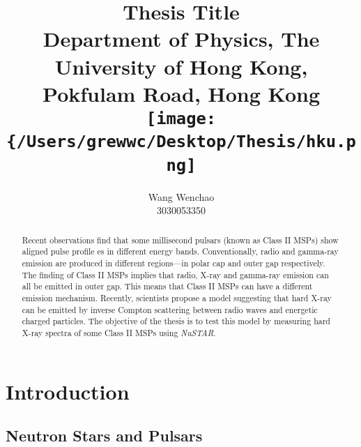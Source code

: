 \documentclass[12pt]{report}
\title{\textbf{Thesis Title}\\ \vspace{1cm}
			{\large Department of Physics, The University of Hong Kong, Pokfulam Road, Hong Kong}\\ \vspace{1cm}
			{\texttt{[image: \{/Users/grewwc/Desktop/Thesis/hku.png]}}}\\ \vspace{3cm}
}
\date{}
\author{Wang Wenchao  \\3030053350}
\begin{document}
\maketitle
\tableofcontents{}
\begin{abstract}
    \normalsize
    Recent observations find that some millisecond pulsars (known as Class II MSPs) show aligned pulse profile
    es in 
    different energy bands. Conventionally, radio and gamma-ray emission are produced in different 
    regions---in polar cap 
    and outer gap respectively. The finding of Class II MSPs implies that radio, X-ray and gamma-ray 
    emission 
    can all be emitted in outer gap. This means that Class II MSPs can have a different emission mechanism. 
    Recently, 
    scientists propose a model suggesting that hard X-ray can be emitted by inverse Compton scattering 
    between radio
    waves and energetic charged particles. The objective of the thesis is to test this model by measuring 
    hard X-ray 
    spectra of some Class II MSPs using \textit{NuSTAR}. 
\end{abstract}
			
		
		
\chapter{Introduction}   	   
    \section{Neutron Stars and Pulsars}
\end{document}
